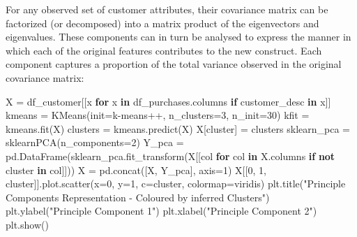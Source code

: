 \documentclass[]{tufte-book}
\newenvironment{Shaded}{}{}
\newcommand{\ControlFlowTok}[1]{\textcolor[rgb]{0.00,0.44,0.13}{\textbf{#1}}}
\newcommand{\DecValTok}[1]{\textcolor[rgb]{0.25,0.63,0.44}{#1}}
\newcommand{\KeywordTok}[1]{\textcolor[rgb]{0.00,0.44,0.13}{\textbf{#1}}}
\newcommand{\NormalTok}[1]{#1}
\newcommand{\OperatorTok}[1]{\textcolor[rgb]{0.40,0.40,0.40}{#1}}
\newcommand{\StringTok}[1]{\textcolor[rgb]{0.25,0.44,0.63}{#1}}
\theoremstyle{definition}
\theoremstyle{definition}
\theoremstyle{definition}
\theoremstyle{remark}
\begin{document}
For any observed set of customer attributes, their covariance matrix can be factorized (or decomposed) into a matrix product of the eigenvectors and eigenvalues. These components can in turn be analysed to express the manner in which each of the original features contributes to the new construct. Each component captures a proportion of the total variance observed in the original covariance matrix:

\begin{Shaded}
\begin{Highlighting}[]
\NormalTok{X }\OperatorTok{=}\NormalTok{ df\_customer[[x }\ControlFlowTok{for}\NormalTok{ x }\KeywordTok{in}\NormalTok{ df\_purchases.columns }
\ControlFlowTok{if} \StringTok{\textquotesingle{}customer\_desc\textquotesingle{}} \KeywordTok{in}\NormalTok{ x]]}
\NormalTok{kmeans }\OperatorTok{=}\NormalTok{ KMeans(init}\OperatorTok{=}\StringTok{\textquotesingle{}k{-}means++\textquotesingle{}}\NormalTok{, n\_clusters}\OperatorTok{=}\DecValTok{3}\NormalTok{, n\_init}\OperatorTok{=}\DecValTok{30}\NormalTok{)}
\NormalTok{kfit }\OperatorTok{=}\NormalTok{ kmeans.fit(X)}
\NormalTok{clusters }\OperatorTok{=}\NormalTok{ kmeans.predict(X)}
\NormalTok{X[}\StringTok{\textquotesingle{}cluster\textquotesingle{}}\NormalTok{] }\OperatorTok{=}\NormalTok{ clusters}
\NormalTok{sklearn\_pca }\OperatorTok{=}\NormalTok{ sklearnPCA(n\_components}\OperatorTok{=}\DecValTok{2}\NormalTok{)}
\NormalTok{Y\_pca }\OperatorTok{=}\NormalTok{ pd.DataFrame(sklearn\_pca.fit\_transform(X[[col }\ControlFlowTok{for}\NormalTok{ col }\KeywordTok{in}\NormalTok{ X.columns }\ControlFlowTok{if}
                                         \KeywordTok{not} \StringTok{\textquotesingle{}cluster\textquotesingle{}} \KeywordTok{in}\NormalTok{ col]]))}
\NormalTok{X }\OperatorTok{=}\NormalTok{ pd.concat([X, Y\_pca], axis}\OperatorTok{=}\DecValTok{1}\NormalTok{)}
\NormalTok{X[[}\DecValTok{0}\NormalTok{, }\DecValTok{1}\NormalTok{, }\StringTok{\textquotesingle{}cluster\textquotesingle{}}\NormalTok{]].plot.scatter(x}\OperatorTok{=}\DecValTok{0}\NormalTok{,}
\NormalTok{                      y}\OperatorTok{=}\DecValTok{1}\NormalTok{,}
\NormalTok{                      c}\OperatorTok{=}\StringTok{\textquotesingle{}cluster\textquotesingle{}}\NormalTok{,}
\NormalTok{                      colormap}\OperatorTok{=}\StringTok{\textquotesingle{}viridis\textquotesingle{}}\NormalTok{)}
\NormalTok{plt.title(}\StringTok{"Principle Components Representation {-} Coloured by inferred Clusters"}\NormalTok{)}
\NormalTok{plt.ylabel(}\StringTok{"Principle Component 1"}\NormalTok{)}
\NormalTok{plt.xlabel(}\StringTok{"Principle Component 2"}\NormalTok{)}
\NormalTok{plt.show()}
\end{Highlighting}
\end{Shaded}
\end{document}

